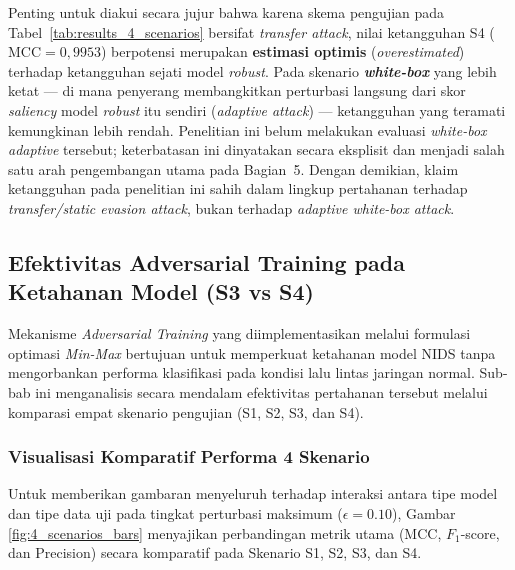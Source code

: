 \documentclass[11pt, a4paper]{article}
\begin{document}
Penting untuk diakui secara jujur bahwa karena skema pengujian pada Tabel~\ref{tab:results_4_scenarios} bersifat \textit{transfer attack}, nilai ketangguhan S4 ($\text{MCC} = 0{,}9953$) berpotensi merupakan \textbf{estimasi optimis} (\textit{overestimated}) terhadap ketangguhan sejati model \textit{robust}. Pada skenario \textbf{\textit{white-box}} yang lebih ketat --- di mana penyerang membangkitkan perturbasi langsung dari skor \textit{saliency} model \textit{robust} itu sendiri (\textit{adaptive attack}) --- ketangguhan yang teramati kemungkinan lebih rendah. Penelitian ini belum melakukan evaluasi \textit{white-box adaptive} tersebut; keterbatasan ini dinyatakan secara eksplisit dan menjadi salah satu arah pengembangan utama pada Bagian~5. Dengan demikian, klaim ketangguhan pada penelitian ini sahih dalam lingkup pertahanan terhadap \textit{transfer/static evasion attack}, bukan terhadap \textit{adaptive white-box attack}.


\subsection{Efektivitas Adversarial Training pada Ketahanan Model (S3 vs S4)}
Mekanisme \textit{Adversarial Training} yang diimplementasikan melalui formulasi optimasi \textit{Min-Max} bertujuan untuk memperkuat ketahanan model NIDS tanpa mengorbankan performa klasifikasi pada kondisi lalu lintas jaringan normal. Sub-bab ini menganalisis secara mendalam efektivitas pertahanan tersebut melalui komparasi empat skenario pengujian (S1, S2, S3, dan S4).

\subsubsection{Visualisasi Komparatif Performa 4 Skenario}
Untuk memberikan gambaran menyeluruh terhadap interaksi antara tipe model dan tipe data uji pada tingkat perturbasi maksimum ($\epsilon = 0.10$), Gambar \ref{fig:4_scenarios_bars} menyajikan perbandingan metrik utama (MCC, $F_1$-score, dan Precision) secara komparatif pada Skenario S1, S2, S3, dan S4.
\end{document}
